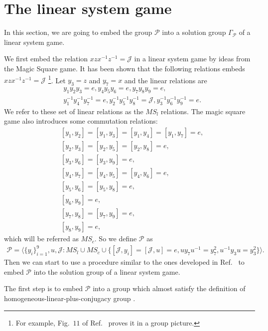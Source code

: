 \documentclass[11pt,letterpaper]{article}
\newcommand{\1}{\mathbb{1}}
\newcommand{\Pg}{\mathcal{P}}
\newcommand{\J}{\mathcal{J}}
\newcommand{\MS}{MS}
\theoremstyle{definition}
\begin{document}



\appendix
\section{The linear system game}
\label{sec:construct}
In this section, we are going to embed the group $\Pg$ into a solution group $\Gamma_\Pg$ of a linear system game.

We first embed the relation $xzx^{-1}z^{-1} = \J$ in a linear system game by ideas from the Magic Square game.
It has been shown that the following relations embeds $xzx^{-1}z^{-1} = \J$ \footnote{For example, Fig.~$11$ of Ref.~\cite{coladan2017}
proves it in a group picture.}. Let $y_3 = z$ and $y_7 = x$ and the linear relations are 
\begin{align}
	&y_1y_2y_3 = e,
	y_4y_5y_6 = e,
	y_7y_8y_9 = e,\\
	&y_1^{-1}y_4^{-1}y_7^{-1} = e,
	y_2^{-1}y_5^{-1}y_8^{-1} = \J,
	y_3^{-1}y_6^{-1}y_9^{-1} = e.
\end{align}
We refer to these set of linear relations as the $\MS_l$ relations.
The magic square game also introduces some commutation relations:
\begin{align}
	&[y_1, y_2] = [y_1, y_3] = [y_1, y_4] = [y_1,y_7] = e,\\
	&[y_2, y_3] = [y_2, y_5] = [y_2, y_8] = e,\\
	&[y_3, y_6] = [y_3, y_9] = e,\\
	&[y_4, y_7] = [y_4,y_5] =  [y_4,y_6] = e, \\
	& [y_5,y_6] =  [y_5,y_8] = e,\\
	& [y_6,y_9] = e,\\
	& [y_7,y_8] =  [y_7,y_9] = e,\\
	&[y_8,y_9] = e,
\end{align}
which will be referred as $\MS_c$.
So we define $\Pg$ as 
\begin{align}
	\Pg = \langle \{y_i\}_{i=1}^9,u,\J: \MS_l \cup \MS_c \cup \{ [\J, y_i] = [\J, u] = e,
					uy_7u^{-1} = y_7^2, u^{-1}y_3u = y_3^2\}	 \rangle.
\end{align}
Then we can start to use a procedure similar to the ones developed in Ref.~\cite{slofstra2017} to embed $\Pg$ into the solution group of a linear system game.

The first step is to embed $\Pg$ into a group which almost satisfy the definition of homogeneous-linear-plus-conjugacy group
\cite{slofstra2017}.
\end{document}
